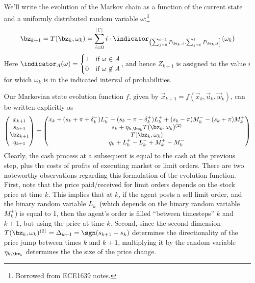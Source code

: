 \documentclass[12pt]{article}
\begin{document}
We'll write the evolution of the Markov chain as a function of the current state and a uniformly distributed random variable $\omega$:\footnote{Borrowed from ECE1639 notes.}
\begin{equation}
\bz_{k+1} = T(\bz_k, \omega_k) = \sum_{i=0}^{|\Gamma|} i \cdot \indicator_{\left( \sum_{j=0}^{i-1} P_{\bz_k,j} , \sum_{j=0}^{i} P_{\bz_k,j} \right]} (\omega_k)
\end{equation}
Here $\indicator_A(\omega) = \begin{cases} 1 & \text{if } \omega \in A \\
0 & \text{if } \omega \not\in A
\end{cases}$, and hence $Z_{k+1}$ is assigned to the value $i$ for which $\omega_k$ is in the indicated interval of probabilities.

Our Markovian state evolution function $f$, given by $\vec{x}_{k+1} = f \left( \vec{x}_{k},\vec{u}_{k}, \vec{w}_{k} \right)$, can be written explicitly as
\begin{equation}
\label{eq:discretestateevolution}
\begin{pmatrix}
x_{k+1} \\
s_{k+1} \\
\bz_{k+1} \\
q_{k+1} 
\end{pmatrix} = \begin{pmatrix}
x_k + (s_k + \pi + \delta_k^-)L_k^- - (s_k - \pi - \delta_k^+)L_k^+ + (s_k - \pi)M_k^- - (s_k + \pi)M_k^+ \\
s_{k} + \eta_{k,\bz_k} T(\bz_k, \omega_k)^{(2)} \\
T(\bz_k, \omega_k) \\
q_{k} + L_k^+ - L_k^- + M_k^+ - M_k^-
\end{pmatrix}
\end{equation}
Clearly, the cash process at a subsequent is equal to the cash at the previous step, plus the costs of profits of executing market or limit orders. There are two noteworthy observations regarding this formulation of the evolution function. First, note that the price paid/received for limit orders depends on the stock price at time $k$. This implies that at $k$, if the agent posts a sell limit order, and the binary random variable $L_k^-$ (which depends on the binary random variable $M_k^+$) is equal to 1, then the agent's order is filled ``between timesteps'' $k$ and $k+1$, but using the price at time $k$. Second, since the second dimension $T(\bz_k, \omega_k)^{(2)} = \Delta_{k+1} = \sgn(s_{k+1} - s_k)$ determines the directionality of the price jump between times $k$ and $k+1$, multiplying it by the random variable $\eta_{k,\bz_k}$ determines the the size of the price change.
\end{document}
